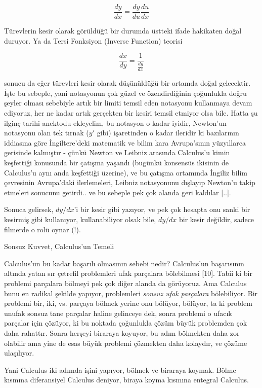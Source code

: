 \documentclass[12pt,fleqn]{article}\usepackage{../../common}
\begin{document}
$$ \frac{dy}{dx} = \frac{dy}{du}\frac{du}{dx} $$

Türevlerin kesir olarak görüldüğü bir durumda üstteki ifade hakikaten doğal
duruyor. Ya da Tersi Fonksiyon (Inverse Function) teorisi

$$ \frac{dx}{dy} = \frac{1}{\frac{dy}{dx}} $$

sonucu da eğer türevleri kesir olarak düşünüldüğü bir ortamda doğal
gelecektir. İşte bu sebeple, yani notasyonun çok güzel ve özendirdiğinin
çoğunlukla doğru şeyler olması sebebiyle artık bir limiti temsil eden
notasyonu kullanmaya devam ediyoruz, her ne kadar artık gerçekten bir
kesiri temsil etmiyor olsa bile. Hatta şu ilginç tarihi anektodu ekleyelim,
bu notasyon o kadar iyidir, Newton'un notasyonu olan tek tırnak ($y'$ gibi)
işaretinden o kadar ileridir ki bazılarının iddiasına göre İngiltere'deki
matematik ve bilim kara Avrupa'sının yüzyıllarca gerisinde kalmıştır -
çünkü Newton ve Leibniz arasında Calculus'u kimin keşfettiği konusunda bir
çatışma yaşandı (bugünkü konsensüs ikisinin de Calculus'u aynı anda
keşfettiği üzerine), ve bu çatışma ortamında İngiliz bilim çevresinin
Avrupa'daki ilerlemeleri, Leibniz notasyonunu dışlayıp Newton'u takip
etmeleri sonucunu getirdi.. ve bu sebeple pek çok alanda geri kaldılar
[..].

Sonuca gelirsek, $dy/dx$'i bir kesir gibi yazıyor, ve pek çok hesapta onu
sanki bir kesirmiş gibi kullanıyor, kullanabiliyor olsak bile, $dy/dx$ bir
kesir değildir, sadece filmerde o rolü oynar (!).

\newpage 

Sonsuz Kuvvet, Calculus'un Temeli

Calculus'un bu kadar başarılı olmasının sebebi nedir? Calculus'un
başarısının altında yatan sır çetrefil problemleri ufak parçalara
bölebilmesi [10]. Tabii ki bir problemi parçalara bölmeyi pek çok diğer
alanda da görüyoruz. Ama Calculus bunu en radikal şekilde yapıyor,
problemleri {\em sonsuz ufak parçalara} bölebiliyor. Bir problemi bir, iki,
vs. parçaya bölmek yerine onu bölüyor, bölüyor, ta ki problem unufak sonsuz
tane parçalar haline gelinceye dek, sonra problemi o ufacık parçalar için
çözüyor, ki bu noktada çoğunlukla çözüm büyük problemden çok daha rahattır.
Sonra herşeyi biraraya koyuyor, bu adım bölmekten daha zor olabilir ama
yine de esas büyük problemi çözmekten daha kolaydır, ve çözüme ulaşılıyor.

Yani Calculus iki adımda işini yapıyor, bölmek ve biraraya koymak. Bölme
kısmına diferansiyel Calculus deniyor, biraya koyma kısmına entegral
Calculus.
\end{document}
